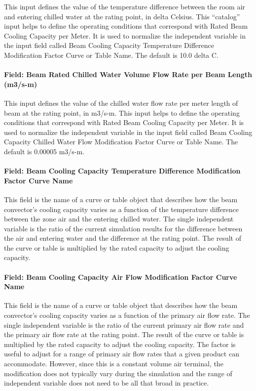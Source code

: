 This input defines the value of the temperature difference between the room air and entering chilled water at the rating point, in delta Celsius. This ``catalog'' input helps to define the operating conditions that correspond with Rated Beam Cooling Capacity per Meter. It is used to normalize the independent variable in the input field called Beam Cooling Capacity Temperature Difference Modification Factor Curve or Table Name. The default is 10.0 delta C.

\paragraph{Field: Beam Rated Chilled Water Volume Flow Rate per Beam Length (m3/s-m)}\label{field-beam-rated-chilled-water-volume-flow-rate-per-beam-length-m3s-m}

This input defines the value of the chilled water flow rate per meter length of beam at the rating point, in m3/s-m. This input helps to define the operating conditions that correspond with Rated Beam Cooling Capacity per Meter. It is used to normalize the independent variable in the input field called Beam Cooling Capacity Chilled Water Flow Modification Factor Curve or Table Name. The default is 0.00005 m3/s-m.

\paragraph{Field: Beam Cooling Capacity Temperature Difference Modification Factor Curve Name}\label{field-beam-cooling-capacity-temperature-difference-modification-factor-curve-name}

This field is the name of a curve or table object that describes how the beam convector's cooling capacity varies as a function of the temperature difference between the zone air and the entering chilled water. The single independent variable is the ratio of the current simulation results for the difference between the air and entering water and the difference at the rating point. The result of the curve or table is multiplied by the rated capacity to adjust the cooling capacity.

\paragraph{Field: Beam Cooling Capacity Air Flow Modification Factor Curve Name}\label{field-beam-cooling-capacity-air-flow-modification-factor-curve-name}

This field is the name of a curve or table object that describes how the beam convector's cooling capacity varies as a function of the primary air flow rate. The single independent variable is the ratio of the current primary air flow rate and the primary air flow rate at the rating point. The result of the curve or table is multiplied by the rated capacity to adjust the cooling capacity. The factor is useful to adjust for a range of primary air flow rates that a given product can accommodate. However, since this is a constant volume air terminal, the modification does not typically vary during the simulation and the range of independent variable does not need to be all that broad in practice.

